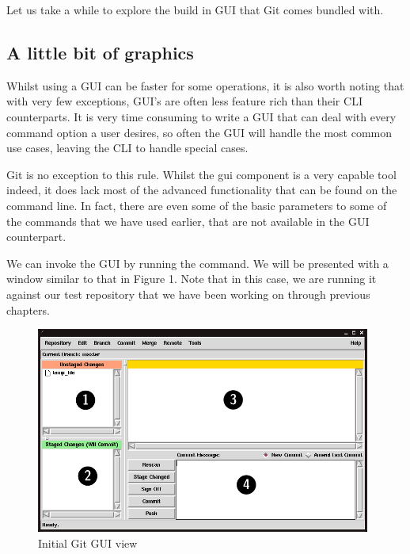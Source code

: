 Let us take a while to explore the build in GUI that Git comes bundled with.

\subsection{A little bit of graphics}
Whilst using a GUI can be faster for some operations, it is also worth noting that with very few exceptions, GUI's are often less feature rich than their CLI counterparts.
It is very time consuming to write a GUI that can deal with every command option a user desires, so often the GUI will handle the most common use cases, leaving the CLI to handle special cases.

Git is no exception to this rule.
Whilst the gui component is a very capable tool indeed, it does lack most of the advanced functionality that can be found on the command line.
In fact, there are even some of the basic parameters to some of the commands that we have used earlier, that are not available in the GUI counterpart.

We can invoke the GUI by running the  command.
We will be presented with a window similar to that in Figure 1.
Note that in this case, we are running it against our test repository that we have been working on through previous chapters.

\begin{figure}[hbt]
\centering
\includegraphics[width=11cm]{images/f-w5-d1.png}
\caption{Initial Git GUI view}
\end{figure}

